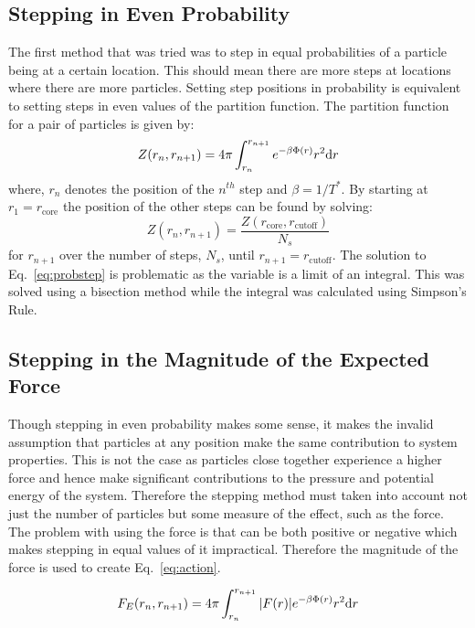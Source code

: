 \documentclass[12pt]{UoAthesis} \usepackage{booktabs}
\begin{document}
\subsection{Stepping in Even Probability }
\label{sec:probstep}
The first method that was tried was to step in equal probabilities of
a particle being at a certain location.  This should mean there are
more steps at locations where there are more particles. Setting step
positions in probability is equivalent to setting steps in even values
of the partition function. The partition function~\cite{Landau1968}
for a pair of particles is given by:
\begin{equation}
  Z(r_n, r_{n+1}) = 4\pi\int^{r_{n+1}}_{r_n}e^{-\beta\Phi(r)}r^2{\rm d}r 
  \label{eq:partition}
\end{equation}
where, $r_n$ denotes the position of the $n^{th}$ step and $\beta =
1/T^*$.  By starting at $r_1=r_\text{core}$ the
position of the other steps can be found by solving:
\begin{equation}
  Z(r_n, r_{n+1}) = \frac{Z(r_{\text{core}}, r_{\text{cutoff}})}{N_s}
  \label{eq:probstep}
\end{equation}
for $r_{n+1}$ over the number of steps, $N_s$, until
$r_{n+1}=r_{\text{cutoff}}$.  The solution to Eq.~\eqref{eq:probstep}
is problematic as the variable is a limit of an integral.  This was
solved using a bisection method while the integral was calculated
using Simpson's Rule.

\subsection{Stepping in the Magnitude of the Expected Force}
\label{sec:actionstep}
Though stepping in even probability makes some sense, it makes the
invalid assumption that particles at any position make the same
contribution to system properties.  This is not the case as particles
close together experience a higher force and hence make significant
contributions to the pressure and potential energy of the system.
Therefore the stepping method must taken into account not just the
number of particles but some measure of the effect, such as the force.
The problem with using the force is that can be both positive or
negative which makes stepping in equal values of it impractical.
Therefore the magnitude of the force is used to create
Eq.~\eqref{eq:action}.

\begin{equation}
F_E(r_n, r_{n+1}) = 4\pi \int^{r_{n+1}}_{r_n}|F(r)|e^{-\beta\Phi(r)}r^2{\rm d}r 
\label{eq:action}
\end{equation}
\end{document}
